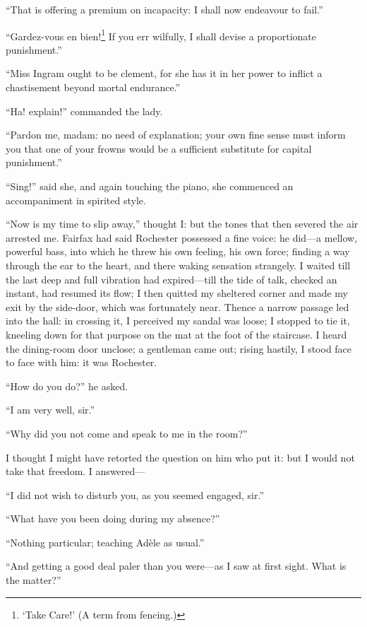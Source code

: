 \enquote{That is offering a premium on incapacity: I shall now endeavour
	to fail.}

\enquote{\foreignlanguage{french}{Gardez-vous en bien!}\footnote{\enquote{Take Care!} (A term from fencing.)} If you err wilfully, I shall devise a
	proportionate punishment.}

\enquote{Miss Ingram ought to be clement, for she has it in her power to
	inflict a chastisement beyond mortal endurance.}

\enquote{Ha! explain!} commanded the lady.

\enquote{Pardon me, madam: no need of explanation; your own fine sense
	must inform you that one of your frowns would be a sufficient substitute
	for capital punishment.}

\enquote{Sing!} said she, and again touching the piano, she commenced an
accompaniment in spirited style.

\enquote{Now is my time to slip away,} thought I: but the tones that
then severed the air arrested me. \Mrs{} Fairfax had said \Mr{} Rochester
possessed a fine voice: he did---a mellow, powerful bass, into which he
threw his own feeling, his own force; finding a way through the ear to
the heart, and there waking sensation strangely. I waited till the last
deep and full vibration had expired---till the tide of talk, checked an
instant, had resumed its flow; I then quitted my sheltered corner and
made my exit by the side-door, which was fortunately near. Thence a
narrow passage led into the hall: in crossing it, I perceived my sandal
was loose; I stopped to tie it, kneeling down for that purpose on the
mat at the foot of the staircase. I heard the dining-room door unclose;
a gentleman came out; rising hastily, I stood face to face with him: it
was \Mr{} Rochester.

\enquote{How do you do?} he asked.

\enquote{I am very well, sir.}

\enquote{Why did you not come and speak to me in the room?}

I thought I might have retorted the question on him who put it: but I
would not take that freedom. I answered---

\enquote{I did not wish to disturb you, as you seemed engaged, sir.}

\enquote{What have you been doing during my absence?}

\enquote{Nothing particular; teaching Adèle as usual.}

\enquote{And getting a good deal paler than you were---as I saw at first
	sight. What is the matter?}

